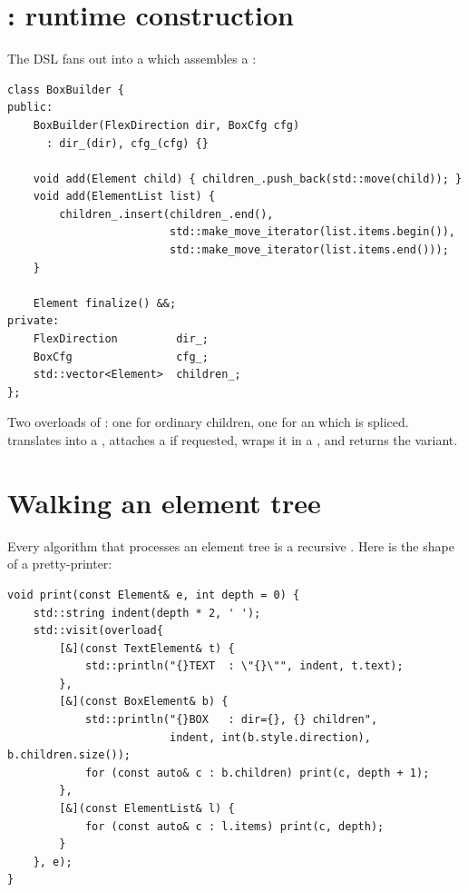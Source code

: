 \section{: runtime construction}

The DSL  fans out into a  which
assembles a :

\begin{lstlisting}
class BoxBuilder {
public:
    BoxBuilder(FlexDirection dir, BoxCfg cfg)
      : dir_(dir), cfg_(cfg) {}

    void add(Element child) { children_.push_back(std::move(child)); }
    void add(ElementList list) {
        children_.insert(children_.end(),
                         std::make_move_iterator(list.items.begin()),
                         std::make_move_iterator(list.items.end()));
    }

    Element finalize() &&;
private:
    FlexDirection         dir_;
    BoxCfg                cfg_;
    std::vector<Element>  children_;
};
\end{lstlisting}

Two overloads of : one for ordinary children, one for an
 which is spliced.  translates
 into a , attaches a 
if requested, wraps it in a , and returns the
variant.

\section{Walking an element tree}

Every algorithm that processes an element tree is a recursive
. Here is the shape of a pretty-printer:

\begin{lstlisting}
void print(const Element& e, int depth = 0) {
    std::string indent(depth * 2, ' ');
    std::visit(overload{
        [&](const TextElement& t) {
            std::println("{}TEXT  : \"{}\"", indent, t.text);
        },
        [&](const BoxElement& b) {
            std::println("{}BOX   : dir={}, {} children",
                         indent, int(b.style.direction), b.children.size());
            for (const auto& c : b.children) print(c, depth + 1);
        },
        [&](const ElementList& l) {
            for (const auto& c : l.items) print(c, depth);
        }
    }, e);
}
\end{lstlisting}

